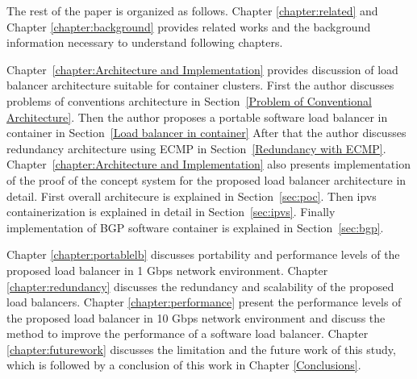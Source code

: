 The rest of the paper is organized as follows.
Chapter \ref{chapter:related} and Chapter \ref{chapter:background} provides related works and the background information necessary to understand following chapters.

Chapter~\ref{chapter:Architecture and Implementation} provides discussion of load balancer architecture suitable for container clusters.
First the author discusses problems of conventions architecture in Section~\ref{Problem of Conventional Architecture}.
Then the author proposes a portable software load balancer in container in Section~\ref{Load balancer in container}
After that the author discusses redundancy architecture using ECMP in Section~\ref{Redundancy with ECMP}. 
Chapter~\ref{chapter:Architecture and Implementation} also presents implementation of the proof of the concept system for the proposed load balancer architecture in detail.
First overall architecure is explained in Section~\ref{sec:poc}.
Then ipvs containerization is explained in detail in Section~\ref{sec:ipvs}.
Finally implementation of BGP software container is explained in Section~\ref{sec:bgp}.

Chapter \ref{chapter:portablelb} discusses portability and performance levels of the proposed load balancer in 1 Gbps network environment.
Chapter \ref{chapter:redundancy} discusses the redundancy and scalability of the proposed load balancers.
Chapter \ref{chapter:performance} present the performance levels of the proposed load balancer in 10 Gbps network environment and discuss the method to improve the performance of a software load balancer.
Chapter \ref{chapter:futurework} discusses the limitation and the future work of this study,
which is followed by a conclusion of this work in Chapter \ref{Conclusions}.





